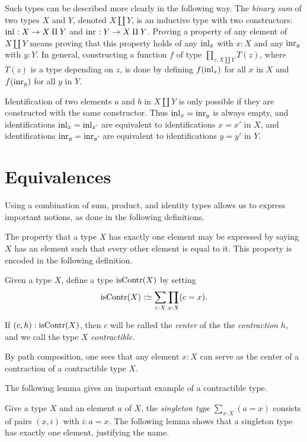 Such types can be described more clearly in the following way.
The \emph{binary sum} of two types $X$ and $Y$, denoted $X \amalg Y$,
is an inductive type with two constructors: $\inl{} : X \to X \amalg Y$ and
$\inr{} : Y \to X \amalg Y$. Proving a property of any element of $X \amalg Y$
means proving that this property holds of any $\inl{x}$ with $x:X$ and any
$\inr{y}$ with $y:Y$. In general, constructing a function $f$ of type
$\prod_{z: X \amalg Y} T(z)$, where $T(z)$ is a type depending on 
$z$, is done by defining $f(\inl{x})$ for all $x$ in $X$
and $f(\inr{y})$ for all $y$ in $Y$.

Identification of two elements $a$ and $b$ in $X \amalg Y$ is 
only possible if they are constructed with the same constructor.
Thus $\inl{x} = \inr{y}$ is always empty, and identifications
$\inl{x} = \inl{x'}$ are equivalent to identifications $x=x'$ in $X$,
and identifications
$\inr{y} = \inr{y'}$ are equivalent to identifications $y=y'$ in $Y$.

\section{Equivalences}\label{sec:equivalence}

Using a combination of sum, product, and identity types allows
us to express important notions, as done in the following
definitions.

The property that a type $X$ has exactly one element may be expressed by saying $X$ has an element such that every other element is equal to it.
This property is encoded in the following definition.

\begin{definition}
  \label{def:contractible}
  Given a type $X$, define a type $\mathrm{isContr}(X)$ by setting
  $$\iscontr(X) \defeq \sum_{c:X} \prod_{x:X} (c=x).$$
\end{definition}

If $ (c,h) : \mathrm{isContr}(X) $, then $c$ will be called the {\em center} of the
the {\em contraction} $h$, and we call the type $X$ \emph{contractible}.

By path composition, one sees that any element $x : X$ can serve as the center of a contraction of a contractible type $X$.

The following lemma gives an important example of a contractible type.

Give a type $X$ and an element $a$ of $X$, 
the \emph{singleton type} $\sum_{x:X} (a=x)$
consists of pairs $(x,i)$ with $i: a=x$. The following lemma shows that a singleton type has exactly one element, justifying the name.

